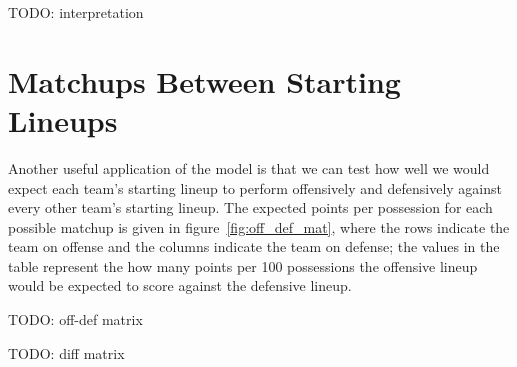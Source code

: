 \begin{table}
    \centering
    \noindent{}
    \caption{TODO}
    \label{tab:lineup_ratings}
\end{table}

TODO: interpretation

\section{Matchups Between Starting Lineups}

Another useful application of the model is that we can test how well we would expect
each team's starting lineup to perform offensively and defensively against every
other team's starting lineup. The expected points per possession for each possible
matchup is given in figure~\ref{fig:off_def_mat}, where the rows indicate the team
on offense and the columns indicate the team on defense; the values in the table
represent the how many points per 100 possessions the offensive lineup would be
expected to score against the defensive lineup.

TODO: off-def matrix


TODO: diff matrix

